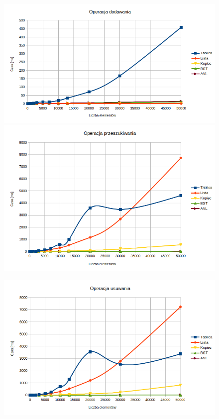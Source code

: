 \documentclass[a4paper, 11pt]{article}
\begin{document}
	
	\newpage
	\begin{figure}
		\includegraphics[width=\linewidth]{Wyniki/dodawanie.png}
		\includegraphics[width=\linewidth]{Wyniki/przeszukiwanie.png}
	\end{figure}
	\begin{figure}
		\includegraphics[width=\linewidth]{Wyniki/usuwanie.png}
	\end{figure}
	
\end{document}
